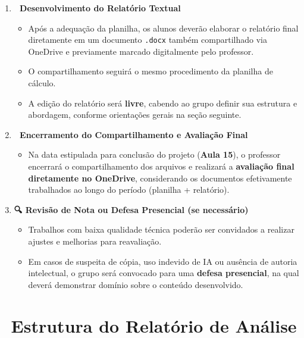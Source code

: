 \documentclass[
  a4paper,
]{book}
\providecommand{\tightlist}{%
  \setlength{\itemsep}{0pt}\setlength{\parskip}{0pt}}\usepackage{longtable,booktabs,array}
\begin{document}
\begin{enumerate}
\def\labelenumi{\arabic{enumi}.}
\setcounter{enumi}{4}
\item
  \textbf{📝 Desenvolvimento do Relatório Textual}

  \begin{itemize}
  \item
    Após a adequação da planilha, os alunos deverão elaborar o relatório
    final diretamente em um documento \texttt{.docx} também
    compartilhado via OneDrive e previamente marcado digitalmente pelo
    professor.
  \item
    O compartilhamento seguirá o mesmo procedimento da planilha de
    cálculo.\\
  \item
    A edição do relatório será \textbf{livre}, cabendo ao grupo definir
    sua estrutura e abordagem, conforme orientações gerais na seção
    seguinte.
  \end{itemize}
\item
  \textbf{📅 Encerramento do Compartilhamento e Avaliação Final}

  \begin{itemize}
  \tightlist
  \item
    Na data estipulada para conclusão do projeto (\textbf{Aula 15}), o
    professor encerrará o compartilhamento dos arquivos e realizará a
    \textbf{avaliação final diretamente no OneDrive}, considerando os
    documentos efetivamente trabalhados ao longo do período (planilha +
    relatório).
  \end{itemize}
\item
  \textbf{🔍 Revisão de Nota ou Defesa Presencial (se necessário)}

  \begin{itemize}
  \item
    Trabalhos com baixa qualidade técnica poderão ser convidados a
    realizar ajustes e melhorias para reavaliação.\\
  \item
    Em casos de suspeita de cópia, uso indevido de IA ou ausência de
    autoria intelectual, o grupo será convocado para uma \textbf{defesa
    presencial}, na qual deverá demonstrar domínio sobre o conteúdo
    desenvolvido.
  \end{itemize}
\end{enumerate}

\section{📑 Estrutura do Relatório de
Análise}\label{estrutura-do-relatuxf3rio-de-anuxe1lise}
\end{document}
